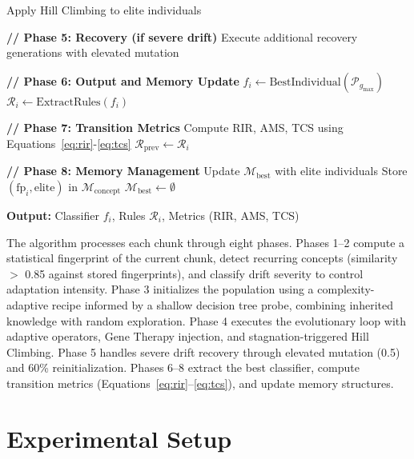 \documentclass[lettersize,journal]{IEEEtran}
\begin{document}
\begin{algorithm}[!t]
\begin{algorithmic}[1]
            \STATE Apply Hill Climbing to elite individuals
        \ENDIF
    \ENDFOR

    \STATE \textbf{// Phase 5: Recovery (if severe drift)}
        \STATE Execute additional recovery generations with elevated mutation
    \ENDIF

    \STATE \textbf{// Phase 6: Output and Memory Update}
    \STATE $f_i \leftarrow \text{BestIndividual}(\mathcal{P}_{g_{\max}})$
    \STATE $\mathcal{R}_i \leftarrow \text{ExtractRules}(f_i)$

    \STATE \textbf{// Phase 7: Transition Metrics}
    \STATE Compute RIR, AMS, TCS using Equations~\ref{eq:rir}-\ref{eq:tcs}
    \STATE $\mathcal{R}_{\text{prev}} \leftarrow \mathcal{R}_i$

    \STATE \textbf{// Phase 8: Memory Management}
    \STATE Update $\mathcal{M}_{\text{best}}$ with elite individuals
    \STATE Store $(\text{fp}_i, \text{elite})$ in $\mathcal{M}_{\text{concept}}$
        \STATE $\mathcal{M}_{\text{best}} \leftarrow \emptyset$
    \ENDIF

    \STATE \textbf{Output:} Classifier $f_i$, Rules $\mathcal{R}_i$, Metrics (RIR, AMS, TCS)
\ENDFOR
\end{algorithmic}
\end{algorithm}

The algorithm processes each chunk through eight phases. Phases 1--2 compute a statistical fingerprint of the current chunk, detect recurring concepts (similarity $>$ 0.85 against stored fingerprints), and classify drift severity to control adaptation intensity. Phase 3 initializes the population using a complexity-adaptive recipe informed by a shallow decision tree probe, combining inherited knowledge with random exploration. Phase 4 executes the evolutionary loop with adaptive operators, Gene Therapy injection, and stagnation-triggered Hill Climbing. Phase 5 handles severe drift recovery through elevated mutation (0.5) and 60\% reinitialization. Phases 6--8 extract the best classifier, compute transition metrics (Equations~\ref{eq:rir}--\ref{eq:tcs}), and update memory structures.



\section{Experimental Setup}
\label{sec:experiments}
\end{document}
